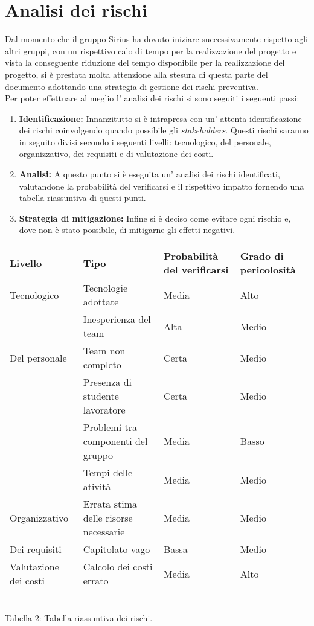 \section{Analisi dei rischi}
Dal momento che il gruppo Sirius ha dovuto iniziare successivamente rispetto agli altri gruppi, con un rispettivo calo di tempo per la realizzazione del progetto e vista la conseguente riduzione del tempo disponibile per la realizzazione del progetto, si è prestata molta attenzione alla stesura di questa parte del documento adottando una strategia di gestione dei rischi preventiva.\\
Per poter effettuare al meglio l' analisi dei rischi si sono seguiti i seguenti passi:
\begin{enumerate}
	\item \textbf{Identificazione: }Innanzitutto si è intrapresa con un' attenta identificazione dei rischi coinvolgendo quando possibile gli \textit{stakeholders}. Questi rischi saranno in seguito divisi secondo i seguenti livelli: tecnologico, del personale, organizzativo, dei requisiti e di valutazione dei costi.
\item \textbf{Analisi: }A questo punto si è eseguita un' analisi dei rischi identificati, valutandone la probabilità del verificarsi e il rispettivo impatto fornendo una tabella riassuntiva di questi punti.
\item \textbf{Strategia di mitigazione: }Infine si è deciso come evitare ogni rischio e, dove non è stato possibile, di mitigarne gli effetti negativi.
\end{enumerate}
\begin{center}
	\begin{tabular}{| >{\centering\arraybackslash}m{1in} | >{\centering\arraybackslash}m{1in} | >{\centering\arraybackslash}m{1in} | >{\centering\arraybackslash}m{1in} |}
		\hline
		\textbf{Livello} & \textbf{Tipo} & \textbf{Probabilità del verificarsi}& \textbf{Grado di pericolosità} \\
		\hline
		Tecnologico & Tecnologie adottate & Media & Alto\\
		\hline
		& Inesperienza del team & Alta & Medio \\		
		\cline{2-4}
		 Del personale   & Team non completo & Certa & Medio \\
		 \cline{2-4}
		& Presenza di studente lavoratore & Certa & Medio \\
		 \cline{2-4}
		 & Problemi tra componenti del gruppo & Media & Basso \\
		 \hline
		 & Tempi delle atività & Media & Medio \\
		 \cline{2-4}
		Organizzativo  & Errata stima delle risorse necessarie & Media & Medio \\
		 \hline
		 Dei requisiti & Capitolato vago & Bassa & Medio \\
		 \hline
		 Valutazione dei costi & Calcolo dei costi errato & Media & Alto \\
		 \hline
	\end{tabular}
	\\
	Tabella 2: Tabella riassuntiva dei rischi.
\end{center}

